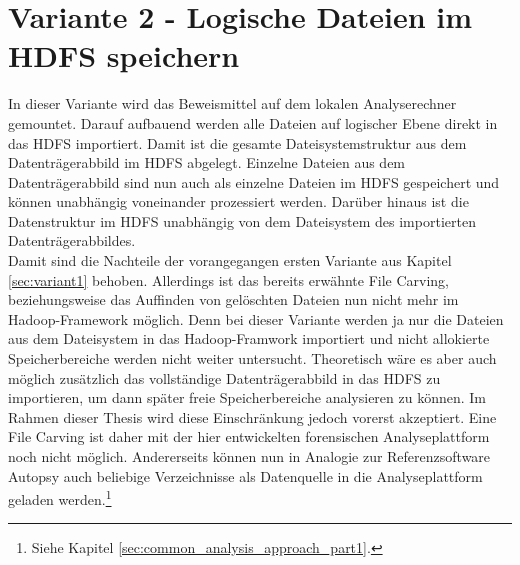 \section{Variante 2 - Logische Dateien im HDFS speichern}
In dieser Variante wird das Beweismittel auf dem lokalen Analyserechner gemountet. Darauf aufbauend werden alle Dateien auf logischer Ebene direkt in das HDFS importiert. Damit ist die gesamte Dateisystemstruktur aus dem Datenträgerabbild im HDFS abgelegt. Einzelne Dateien aus dem Datenträgerabbild sind nun auch als einzelne Dateien im HDFS gespeichert und können unabhängig voneinander prozessiert werden. Darüber hinaus ist die Datenstruktur im HDFS unabhängig von dem Dateisystem des importierten Datenträgerabbildes.\\

\noindent
Damit sind die Nachteile der vorangegangen ersten Variante aus Kapitel \ref{sec:variant1} behoben. Allerdings ist das bereits erwähnte File Carving, beziehungsweise das Auffinden von gelöschten Dateien nun nicht mehr im Hadoop-Framework möglich. Denn bei dieser Variante werden ja nur die Dateien aus dem Dateisystem in das Hadoop-Framwork importiert und nicht allokierte Speicherbereiche werden nicht weiter untersucht. Theoretisch wäre es aber auch möglich zusätzlich das vollständige Datenträgerabbild in das HDFS zu importieren, um dann später freie Speicherbereiche analysieren zu können. Im Rahmen dieser Thesis wird diese Einschränkung jedoch vorerst akzeptiert. Eine File Carving ist daher mit der hier entwickelten forensischen Analyseplattform noch nicht möglich. Andererseits können nun in Analogie zur Referenzsoftware Autopsy auch beliebige Verzeichnisse als Datenquelle in die Analyseplattform geladen werden.\footnote{Siehe Kapitel \ref{sec:common_analysis_approach_part1}.}\\ 

